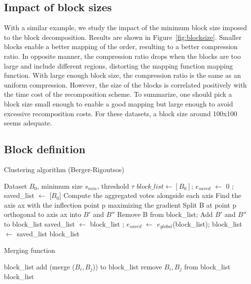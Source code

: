 \documentclass[conference]{IEEEtran}
\theoremstyle{remark}
\begin{document}
\subsection{Impact of block sizes}
\label{sec:blocks}
With a similar example, we study the impact of the minimum block size imposed to the block decomposition.
Results are shown in Figure~\ref{fig:blocksize}.
Smaller blocks enable a better mapping of the order, resulting to a better compression ratio. In opposite manner, the compression ratio drops when the blocks are too large and include different regions, distorting the mapping function mapping function. With large enough block size, the compression ratio is the same as an uniform compression.
However, the size of the blocks is correlated positively with the time cost of the recomposition scheme.
To summarize, one should pick a block size small enough to enable a good mapping but large enough to avoid excessive recomposition costs. For these datasets, a block size around 100x100 seems adequate.

\subsection{Block definition}

\begin{algorithm}
\caption{Clustering algorithm (Berger-Rigoutsos)}
\label{Alg:Berger}
\begin{algorithmic}
\Require Dataset $B_0$, minimum size $s_{min}$, threshold $\tau$
\State $block\_list \gets [B_0]$;
\State $e_{saved}$ $\gets$ 0 ; saved\_list $\gets$ [$B_0$]
\State Compute the aggregated votes alongside each axis
\State Find the axis ax with the inflection point p maximizing the gradient
\State Split B at point p orthogonal to axis ax into $B'$ and $B''$
\State Remove B from block\_list;
\State Add $B'$ and $B''$ to block\_list
\State saved\_list $\gets$ block\_list ; 
\State $e_{saved}$ $\gets$ $e_{global}$(block\_list);
\EndIf
\EndIf
\EndIf
\EndFor
\State block\_list $\gets$  saved\_list
\Return block\_list
\end{algorithmic}
\end{algorithm}


\begin{algorithm}
\caption{Merging function}
\label{Alg:Merge}
\begin{algorithmic}
\Require block\_list
 
\State add (merge ($B_{i},B_{j}$)) to block\_list
\State remove $B_{i},B_{j}$ from block\_list
\EndIf
\EndFor
\EndFor\\
\Return block\_list
\end{algorithmic}
\end{algorithm}
\end{document}
